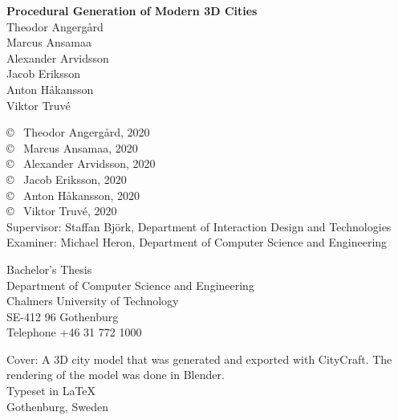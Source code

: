 \newpage
\thispagestyle{empty}
\vspace*{4.5cm}
\textbf{Procedural Generation of Modern 3D Cities} \\
Theodor Angergård \\
Marcus Ansamaa \\
Alexander Arvidsson \\
Jacob Eriksson \\
Anton Håkansson \\
Viktor Truvé \\
\setlength{\parskip}{1cm}

\copyright ~ Theodor Angergård, 2020 \\
\copyright ~ Marcus Ansamaa, 2020 \\
\copyright ~ Alexander Arvidsson, 2020 \\
\copyright ~ Jacob Eriksson, 2020 \\
\copyright ~ Anton Håkansson, 2020 \\
\copyright ~ Viktor Truvé, 2020 \\

Supervisor: Staffan Björk, Department of Interaction Design and Technologies \\
Examiner: Michael Heron, Department of Computer Science and Engineering \setlength{\parskip}{1cm}

Bachelor's Thesis \the\year\\	%
Department of Computer Science and Engineering\\
Chalmers University of Technology\\
SE-412 96 Gothenburg\\
Telephone +46 31 772 1000 \setlength{\parskip}{0.5cm}

\vfill
Cover: A 3D city model that was generated and exported with CityCraft. The rendering of the model was done in Blender. \setlength{\parskip}{0.5cm} \\
Typeset in \LaTeX \\
Gothenburg, Sweden \the\year